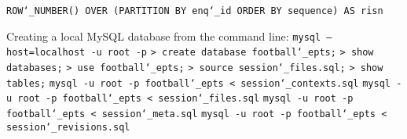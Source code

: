 \texttt{ROW\char`_NUMBER() OVER (PARTITION BY enq\char`_id ORDER BY sequence) AS risn}

\vspace{\baselineskip}
Creating a local MySQL database from the command line:\newline
\texttt{mysql --host=localhost -u root -p}\newline
\texttt{> create database football\char`_epts;}\newline
\texttt{> show databases;}\newline\newline
\texttt{> use football\char`_epts;}\newline
\texttt{> source session\char`_files.sql;}\newline
\texttt{> show tables;}\newline\newline
\texttt{mysql -u root -p football\char`_epts < session\char`_contexts.sql}\newline
\texttt{mysql -u root -p football\char`_epts < session\char`_files.sql}\newline
\texttt{mysql -u root -p football\char`_epts < session\char`_meta.sql}\newline
\texttt{mysql -u root -p football\char`_epts < session\char`_revisions.sql}\newline

\newpage